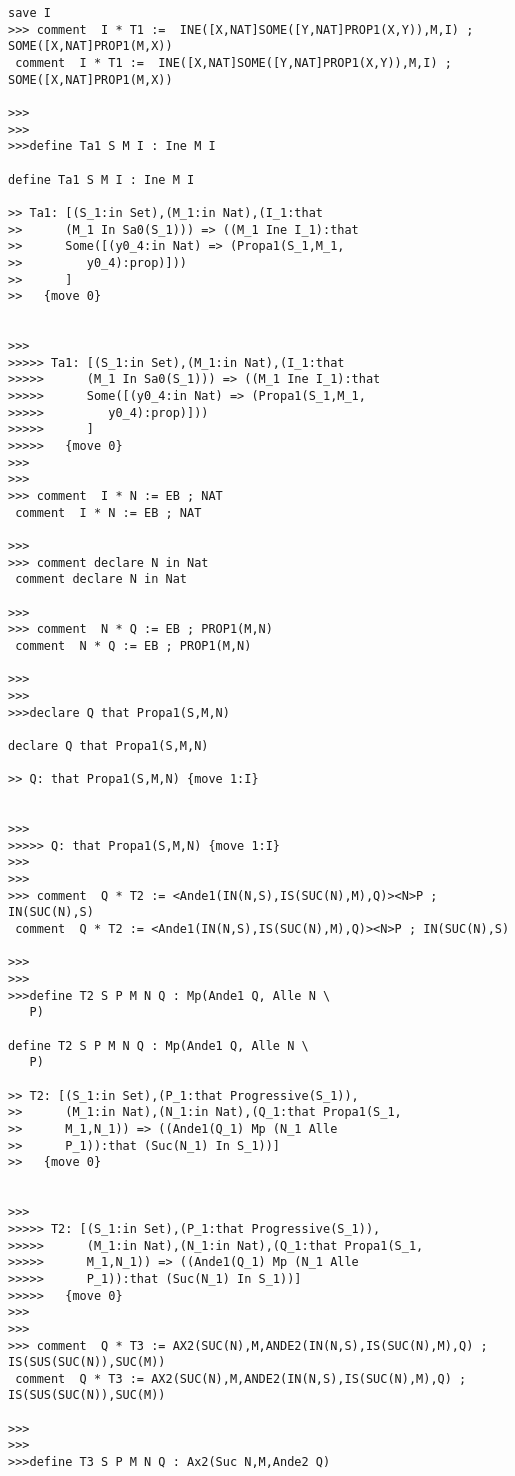 \documentclass{article}
\begin{document}
\begin{verbatim}
save I
>>> comment  I * T1 :=  INE([X,NAT]SOME([Y,NAT]PROP1(X,Y)),M,I) ;  SOME([X,NAT]PROP1(M,X))
 comment  I * T1 :=  INE([X,NAT]SOME([Y,NAT]PROP1(X,Y)),M,I) ;  SOME([X,NAT]PROP1(M,X))

>>>
>>>
>>>define Ta1 S M I : Ine M I

define Ta1 S M I : Ine M I

>> Ta1: [(S_1:in Set),(M_1:in Nat),(I_1:that
>>      (M_1 In Sa0(S_1))) => ((M_1 Ine I_1):that
>>      Some([(y0_4:in Nat) => (Propa1(S_1,M_1,
>>         y0_4):prop)]))
>>      ]
>>   {move 0}


>>>
>>>>> Ta1: [(S_1:in Set),(M_1:in Nat),(I_1:that
>>>>>      (M_1 In Sa0(S_1))) => ((M_1 Ine I_1):that
>>>>>      Some([(y0_4:in Nat) => (Propa1(S_1,M_1,
>>>>>         y0_4):prop)]))
>>>>>      ]
>>>>>   {move 0}
>>>
>>>
>>> comment  I * N := EB ; NAT
 comment  I * N := EB ; NAT

>>>
>>> comment declare N in Nat
 comment declare N in Nat

>>>
>>> comment  N * Q := EB ; PROP1(M,N)
 comment  N * Q := EB ; PROP1(M,N)

>>>
>>>
>>>declare Q that Propa1(S,M,N)

declare Q that Propa1(S,M,N)

>> Q: that Propa1(S,M,N) {move 1:I}


>>>
>>>>> Q: that Propa1(S,M,N) {move 1:I}
>>>
>>>
>>> comment  Q * T2 := <Ande1(IN(N,S),IS(SUC(N),M),Q)><N>P ; IN(SUC(N),S)
 comment  Q * T2 := <Ande1(IN(N,S),IS(SUC(N),M),Q)><N>P ; IN(SUC(N),S)

>>>
>>>
>>>define T2 S P M N Q : Mp(Ande1 Q, Alle N \
   P)

define T2 S P M N Q : Mp(Ande1 Q, Alle N \
   P)

>> T2: [(S_1:in Set),(P_1:that Progressive(S_1)),
>>      (M_1:in Nat),(N_1:in Nat),(Q_1:that Propa1(S_1,
>>      M_1,N_1)) => ((Ande1(Q_1) Mp (N_1 Alle
>>      P_1)):that (Suc(N_1) In S_1))]
>>   {move 0}


>>>
>>>>> T2: [(S_1:in Set),(P_1:that Progressive(S_1)),
>>>>>      (M_1:in Nat),(N_1:in Nat),(Q_1:that Propa1(S_1,
>>>>>      M_1,N_1)) => ((Ande1(Q_1) Mp (N_1 Alle
>>>>>      P_1)):that (Suc(N_1) In S_1))]
>>>>>   {move 0}
>>>
>>>
>>> comment  Q * T3 := AX2(SUC(N),M,ANDE2(IN(N,S),IS(SUC(N),M),Q) ; IS(SUS(SUC(N)),SUC(M))
 comment  Q * T3 := AX2(SUC(N),M,ANDE2(IN(N,S),IS(SUC(N),M),Q) ; IS(SUS(SUC(N)),SUC(M))

>>>
>>>
>>>define T3 S P M N Q : Ax2(Suc N,M,Ande2 Q)


\end{verbatim}
\end{document}
